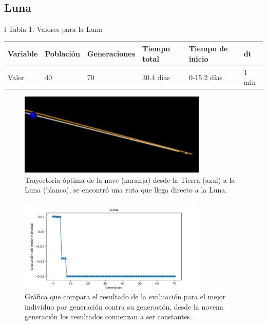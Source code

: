 \documentclass[12pt,letterpaper]{article}
\begin{document}
\subsection*{Luna}


\begin{tabular}{l}
Tabla 1. Valores para la Luna \\
	\begin{tabular}{|l|l|l|l|l|l|}
	\hline
	Variable & Población & Generaciones & Tiempo total & Tiempo de inicio & dt \\	\hline 
	Valor & 40  & 70 & 30.4 días & 0-15.2 días & 1 min  \\ \hline
	\end{tabular}
\end{tabular}

\begin{figure}[H]
\centering
\includegraphics[width=0.8\textwidth]{luna}
\caption{Trayectoria óptima de la nave (naranja) desde la Tierra (azul) a la Luna (blanco), se encontró una ruta que llega directo a la Luna.}
\end{figure}

\begin{figure}[H]
\centering
\includegraphics[width=0.8\textwidth]{Lunaind}
\caption{Gráfica que compara el resultado de la evaluación para el mejor individuo por generación contra su generación, desde la novena generación los resultados comienzan a ser constantes. }
\end{figure}
\end{document}
